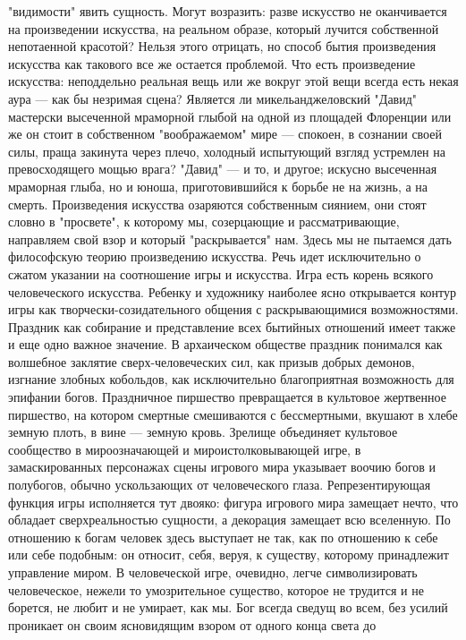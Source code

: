 \documentclass[12pt]{article}
\begin{document}
"видимости" явить сущность. Могут возразить: разве искусство не оканчивается на произведении искусства, на
реальном образе, который лучится собственной непотаенной красотой? Нельзя этого отрицать, но способ бытия
произведения  искусства  как  такового  все  же  остается  проблемой.  Что  есть  произведение  искусства:
неподдельно реальная вещь или же вокруг этой вещи всегда есть некая аура --- как бы незримая сцена? Является
ли микельанджеловский "Давид" мастерски высеченной мраморной глыбой на одной из площадей Флоренции
или же он стоит в собственном "воображаемом" мире --- спокоен, в сознании своей силы, праща закинута через
плечо, холодный испытующий взгляд устремлен на превосходящего мощью врага? "Давид" --- и то, и другое;
искусно высеченная мраморная глыба, но и юноша, приготовившийся к борьбе не на жизнь, а на смерть.
Произведения  искусства  озаряются собственным сиянием,  они  стоят словно в "просвете",  к которому мы,
созерцающие и рассматривающие, направляем свой взор и который "раскрывается" нам. Здесь мы не пытаемся
дать  философскую  теорию  произведению  искусства.  Речь  идет  исключительно  о  сжатом  указании  на
соотношение  игры  и  искусства.  Игра  есть  корень  всякого  человеческого  искусства.  Ребенку  и  художнику
наиболее  ясно  открывается  контур  игры  как  творчески-созидательного  общения  с  раскрывающимися
возможностями. Праздник как собирание и представление всех бытийных отношений имеет также и еще одно
важное значение. В архаическом обществе праздник понимался как волшебное заклятие сверх-человеческих
сил, как призыв добрых демонов, изгнание злобных кобольдов, как исключительно благоприятная возможность
для эпифании богов. Праздничное пиршество превращается в культовое жертвенное пиршество, на котором
смертные смешиваются с бессмертными, вкушают в хлебе земную плоть, в вине --- земную кровь. Зрелище
объединяет  культовое  сообщество  в  мироозначающей  и  мироистолковывающей  игре,  в  замаскированных
персонажах сцены игрового мира указывает воочию богов и полубогов, обычно ускользающих от человеческого
глаза. Репрезентирующая функция игры исполняется тут двояко: фигура игрового мира замещает нечто, что 
обладает сверхреальностью сущности, а декорация замещает всю вселенную. По отношению к богам человек
здесь выступает не так, как по отношению к себе или себе подобным: он относит, себя, веруя, к существу,
которому  принадлежит  управление  миром.  В  человеческой  игре,  очевидно,  легче  символизировать
человеческое, нежели то умозрительное существо, которое не трудится и не борется, не любит и не умирает, как
мы. Бог всегда сведущ во всем, без усилий проникает он своим ясновидящим взором от одного конца света до
\end{document}
